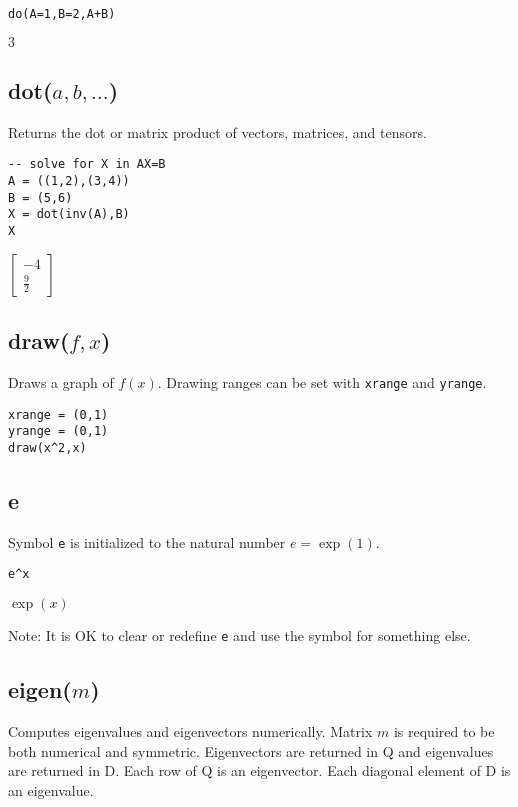 {\color{blue}
\begin{verbatim}
do(A=1,B=2,A+B)
\end{verbatim}
}

\noindent
$3$

\subsection*{dot($a,b,\ldots$)}

Returns the dot or matrix product of vectors, matrices, and tensors.

{\color{blue}
\begin{verbatim}
-- solve for X in AX=B
A = ((1,2),(3,4))
B = (5,6)
X = dot(inv(A),B)
X
\end{verbatim}
}

\noindent
$\displaystyle \begin{bmatrix}-4\\ \tfrac{9}{2}\end{bmatrix}$

\subsection*{draw($f,x$)}

Draws a graph of $f(x)$.
Drawing ranges can be set with {\tt xrange} and {\tt yrange}.

{\color{blue}
\begin{verbatim}
xrange = (0,1)
yrange = (0,1)
draw(x^2,x)
\end{verbatim}
}

\subsection*{e}

Symbol {\tt e} is initialized to the natural number $e=\exp(1)$.

{\color{blue}
\begin{verbatim}
e^x
\end{verbatim}
}

\noindent
$\exp(x)$

\bigskip
\noindent
Note: It is OK to clear or redefine {\tt e} and use the symbol for something else.

\subsection*{eigen($m$)}

Computes eigenvalues and eigenvectors numerically.
Matrix $m$ is required to be both numerical and symmetric.
Eigenvectors are returned in Q and eigenvalues are returned in D.
Each row of Q is an eigenvector.
Each diagonal element of D is an eigenvalue.

